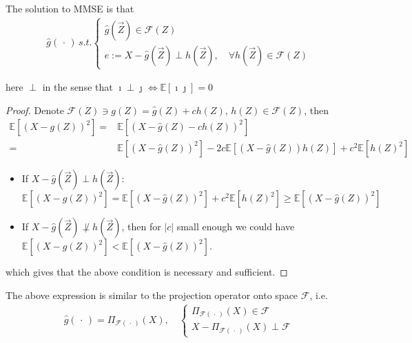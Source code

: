     The solution to MMSE is that
    \begin{align}
         \hat{g}(\, \cdot \, )\, s.t. \begin{cases}
            \hat{g}(\vec{Z})\in \mathscr{F}(Z)\\
            e:=X-\hat{g}(\vec{Z})\perp h(\vec{Z}),\quad \forall h(\vec{Z})\in\mathscr{F}(Z)
         \end{cases}
    \end{align}
    
    here $ \perp $ in the sense that $ \imath \perp \jmath \Leftrightarrow \mathbb{E}\left[ \imath\jmath \right]=0  $
    
    \begin{proof}
        Denote $ \mathscr{F}(Z)\ni g(Z)=\hat{g}(Z)+c h(Z)  ,\,h(Z)\in\mathscr{F}(Z)$, then
        \begin{align}
            \mathbb{E}\left[ (X-g(Z))^2 \right]  =&\mathbb{E}\left[ (X-\hat{g}(Z)-ch(Z))^2 \right]\\
            =&\mathbb{E}\left[ (X-\hat{g}(Z))^2 \right] -2c\mathbb{E}\left[ (X-\hat{g}(Z))h(Z) \right]+c^2\mathbb{E}\left[ h(Z)^2 \right]  
        \end{align}
        
        \begin{itemize}[topsep=2pt,itemsep=0pt]
            \item If $ X-\hat{g}(\vec{Z})\perp h(\vec{Z})  $: $
                \mathbb{E}\left[ (X-g(Z))^2 \right]  =\mathbb{E}\left[ (X-\hat{g}(Z))^2 \right] +c^2\mathbb{E}\left[ h(Z)^2 \right]  \geq \mathbb{E}\left[ (X-\hat{g}(Z))^2 \right]$
            \item If $ X-\hat{g}(\vec{Z})\not\perp h(\vec{Z})  $, then for $ |c| $ small enough we could have $ \mathbb{E}\left[ (X-g(Z))^2 \right]< \mathbb{E}\left[ (X-\hat{g}(Z))^2 \right]$.          
        \end{itemize}
        
        which gives that the above condition is  necessary and sufficient.
    \end{proof}
    
    
    
    The above expression is similar to the projection operator onto space $ \mathscr{F} $, i.e.
    \begin{align}
        \hat{g}(\, \cdot \, )=\Pi_{\mathscr{F(\, \cdot \, )}}(X),\quad \begin{cases}
            \Pi_{\mathscr{F(\, \cdot \, )}}(X)\in \mathscr{F}\\
            X-\Pi_{\mathscr{F(\, \cdot \, )}}(X)\perp \mathscr{F}
        \end{cases}
    \end{align}
    
